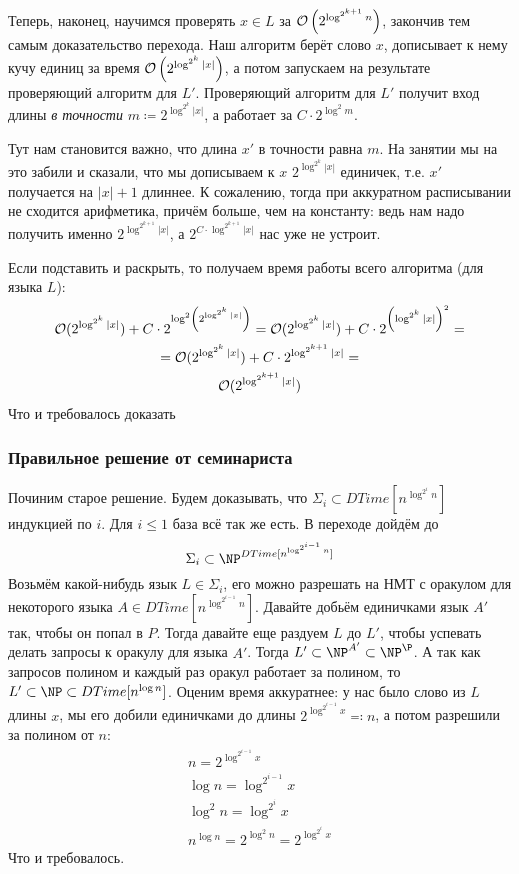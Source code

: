 		Теперь, наконец, научимся проверять $x \in L$ за $\mathcal O\left(2^{\log^{2^{k+1}} n}\right)$, закончив тем самым доказательство перехода.
		Наш алгоритм берёт слово $x$, дописывает к нему кучу единиц за время $\mathcal O\left(2^{\log^{2^k} |x|}\right)$,
		а потом запускаем на результате проверяющий алгоритм для $L'$.
		Проверяющий алгоритм для $L'$ получит вход длины \textit{в точности} $m \coloneq 2^{\log^{2^k} |x|}$, а работает
		за $C \cdot 2^{\log^2 m}$.
		\begin{Rem}
			Тут нам становится важно, что длина $x'$ в точности равна $m$.
			На занятии мы на это забили и сказали, что мы дописываем к $x$
			$2^{\log^{2^k} |x|}$ единичек, т.е. $x'$ получается на $|x|+1$ длиннее.
			К сожалению, тогда при аккуратном расписывании не сходится арифметика, причём больше, чем на константу:
			ведь нам надо получить именно $2^{\log^{2^{k+1}} |x|}$, а $2^{C\cdot \log^{2^{k+1}} |x|}$ нас уже не устроит.
		\end{Rem}
		Если подставить и раскрыть, то получаем время работы всего алгоритма (для языка $L$):
		\begin{gather*}
			\mathcal O(2^{\log^{2^k} |x|}) + C \cdot 2^{\log^2 \left(2^{\log^{2^k} |x|} \right)} =
			\mathcal O(2^{\log^{2^k} |x|}) + C \cdot 2^{\left(\log^{2^k} |x|\right)^2} = \\
			= \mathcal O(2^{\log^{2^k} |x|}) + C \cdot 2^{\log^{2^{k+1}} |x|} = \\
			\mathcal O(2^{\log^{2^{k+1}} |x|})
		\end{gather*}
		Что и требовалось доказать

	\subsubsection{Правильное решение от семинариста}
		Починим старое решение.
		Будем доказывать, что $\Sigma_i \subset DTime[n^{\log^{2^i} n}]$ индукцией по $i$.
		Для $i \le 1$ база всё так же есть.
		В переходе дойдём до
		\[ \Sigma_i \subset \NP^{DTime[n^{\log^{2^{i-1}} n}]} \]
		Возьмём какой-нибудь язык $L\in\Sigma_i$, его можно разрешать на НМТ
		с оракулом для некоторого языка $A \in DTime[n^{\log^{2^{i-1}} n}]$.
		Давайте добьём единичками язык $A'$ так, чтобы он попал в $P$.
		Тогда давайте еще раздуем $L$ до $L'$, чтобы успевать делать запросы к оракулу
		для языка $A'$.
		Тогда $L' \subset \NP^{A'} \subset \NP^\P$.
		А так как запросов полином и каждый раз оракул работает за полином, то $L' \subset \NP \subset DTime[n^{\log n}]$.
		Оценим время аккуратнее: у нас было слово из $L$ длины $x$,
		мы его добили единичками до длины $2^{\log^{2^{i-1}} x} \eqcolon n$, а потом разрешили за полином от $n$:
		\begin{gather*}
			n = 2^{\log^{2^{i-1}} x} \\
			\log n = \log^{2^{i-1}} x \\
			\log^2 n = \log^{2^i} x \\
			n^{\log n} = 2^{\log^2n} = 2^{\log^{2^i} x}
		\end{gather*}
		Что и требовалось.

